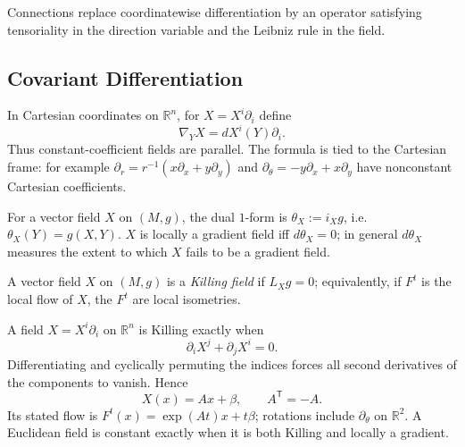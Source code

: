 Connections replace coordinatewise differentiation by an operator satisfying
tensoriality in the direction variable and the Leibniz rule in the field.

\subsection{Covariant Differentiation}

\begin{definition}
  \label{def:pet-ch2-covariant-derivative-euclidean}


  In Cartesian
  coordinates on $\mathbb{R}^n$, for $X=X^i\partial_i$ define
  \[
    \nabla_YX=dX^i(Y)\partial_i.
  \]
  Thus constant-coefficient fields are parallel. The formula is tied to the
  Cartesian frame: for example
  $\partial_r=r^{-1}(x\partial_x+y\partial_y)$ and
  $\partial_\theta=-y\partial_x+x\partial_y$ have nonconstant Cartesian
  coefficients.
\end{definition}

\begin{definition}
  \label{def:pet-ch2-dual-one-form}


  For a vector field $X$ on $(M,g)$, the dual $1$-form is
  $\theta_X:=i_Xg$, i.e.\ $\theta_X(Y)=g(X,Y)$. $X$ is locally a gradient field
  iff $d\theta_X=0$; in general $d\theta_X$ measures the extent to which $X$
  fails to be a gradient field.
\end{definition}

\begin{definition}
  \label{def:pet-ch2-killing-field}


  A vector field $X$ on $(M,g)$ is a \emph{Killing field} if $L_Xg=0$;
  equivalently, if $F^t$ is the local flow of $X$, the $F^t$ are local
  isometries.
\end{definition}

\begin{remark}
  \label{rem:pet-ch2-killing-field-euclidean}


  A field
  $X=X^i\partial_i$ on $\mathbb{R}^n$ is Killing exactly when
  \[
    \partial_iX^j+\partial_jX^i=0.
  \]
  \sketch
  Differentiating and cyclically permuting the indices forces all second
  derivatives of the components to vanish. Hence
  \[
    X(x)=Ax+\beta,\qquad A^{\mathsf T}=-A.
  \]
  Its stated flow is $F^t(x)=\exp(At)x+t\beta$; rotations include
  $\partial_\theta$ on $\mathbb{R}^2$. A Euclidean field is constant exactly
  when it is both Killing and locally a gradient.
\end{remark}

